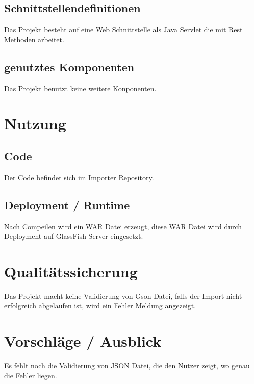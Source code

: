 \subsection{Schnittstellendefinitionen}

Das Projekt besteht auf eine Web Schnittstelle als Java Servlet die mit Rest Methoden arbeitet.
\subsection{genutztes Komponenten}

Das Projekt benutzt keine weitere Konponenten.
\section{Nutzung}
\subsection{Code}
Der Code befindet sich im Importer Repository.


\subsection{Deployment / Runtime}
Nach Compeilen wird ein WAR Datei erzeugt, diese WAR Datei wird durch Deployment auf GlassFish Server eingesetzt.

\section{Qualitätssicherung}
Das Projekt macht keine Validierung von Gson Datei, falls der Import nicht erfolgreich abgelaufen ist, wird ein Fehler Meldung angezeigt.


\section{Vorschläge / Ausblick}
Es fehlt noch die Validierung von JSON Datei, die den Nutzer zeigt, wo genau die Fehler liegen.